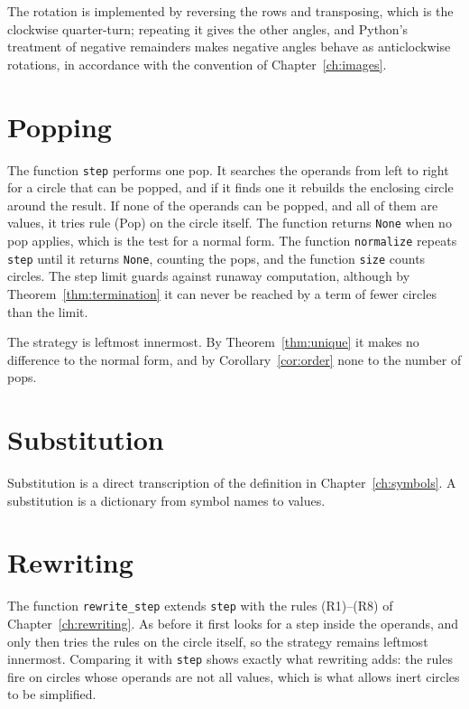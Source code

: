 

The rotation is implemented by reversing the rows and transposing, which is the clockwise quarter-turn; repeating it gives the other angles, and Python's treatment of negative remainders makes negative angles behave as anticlockwise rotations, in accordance with the convention of Chapter~\ref{ch:images}.

\section{Popping}

The function \texttt{step} performs one pop. It searches the operands from left to right for a circle that can be popped, and if it finds one it rebuilds the enclosing circle around the result. If none of the operands can be popped, and all of them are values, it tries rule (Pop) on the circle itself. The function returns \texttt{None} when no pop applies, which is the test for a normal form. The function \texttt{normalize} repeats \texttt{step} until it returns \texttt{None}, counting the pops, and the function \texttt{size} counts circles. The step limit guards against runaway computation, although by Theorem~\ref{thm:termination} it can never be reached by a term of fewer circles than the limit.



The strategy is leftmost innermost. By Theorem~\ref{thm:unique} it makes no difference to the normal form, and by Corollary~\ref{cor:order} none to the number of pops.

\section{Substitution}

Substitution is a direct transcription of the definition in Chapter~\ref{ch:symbols}. A substitution is a dictionary from symbol names to values.



\section{Rewriting}

The function \texttt{rewrite\_step} extends \texttt{step} with the rules (R1)--(R8) of Chapter~\ref{ch:rewriting}. As before it first looks for a step inside the operands, and only then tries the rules on the circle itself, so the strategy remains leftmost innermost. Comparing it with \texttt{step} shows exactly what rewriting adds: the rules fire on circles whose operands are not all values, which is what allows inert circles to be simplified.

